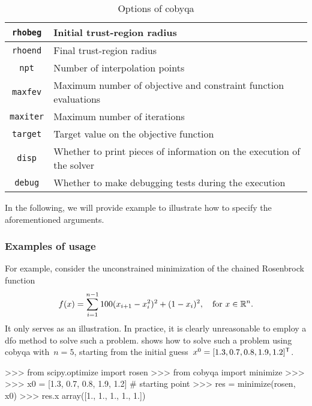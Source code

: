 \begin{table}[ht]
    \caption{Options of \gls{cobyqa}}
    \label{tab:cobyqa-options}
    \centering
    \begin{tabularx}{\textwidth}{cX}
        \toprule
        \texttt{rhobeg}     & Initial trust-region radius\\
        \midrule
        \texttt{rhoend}     & Final trust-region radius\\
        \midrule
        \texttt{npt}        & Number of interpolation points\\
        \midrule
        \texttt{maxfev}     & Maximum number of objective and constraint function evaluations\\
        \midrule
        \texttt{maxiter}    & Maximum number of iterations\\
        \midrule
        \texttt{target}     & Target value on the objective function\\
        \midrule
        \texttt{disp}       & Whether to print pieces of information on the execution of the solver\\
        \midrule
        \texttt{debug}      & Whether to make debugging tests during the execution\\
        \bottomrule
    \end{tabularx}
\end{table}

In the following, we will provide example to illustrate how to specify the aforementioned arguments.

\subsubsection{Examples of usage}

For example, consider the unconstrained minimization of the chained Rosenbrock function
\begin{equation*}
    f(x) = \sum_{i = 1}^{n - 1} 100(x_{i + 1} - x_i^2)^2 + (1 - x_i)^2, \quad \text{for~$x \in \mathbb{R}^n$.}
\end{equation*}
It only serves as an illustration.
In practice, it is clearly unreasonable to employ a \gls{dfo} method to solve such a problem.
 shows how to solve such a problem using \gls{cobyqa} with~$n = 5$, starting from the initial guess~$\iter[0] = [1.3, 0.7, 0.8, 1.9, 1.2]^{\T}$.

\begin{lstpython}[%
    caption=Solving the Rosenbrock problem using \gls{cobyqa},
    label=lst:cobyqa-rosenbrock,
]
    >>> from scipy.optimize import rosen
    >>> from cobyqa import minimize
    >>>
    >>> x0 = [1.3, 0.7, 0.8, 1.9, 1.2]  # starting point
    >>> res = minimize(rosen, x0)
    >>> res.x
    array([1., 1., 1., 1., 1.]) 
\end{lstpython}

